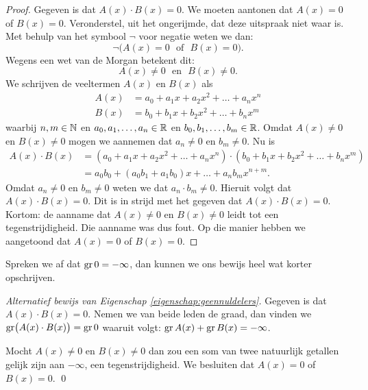 \documentclass{ximera}
\begin{document}
\begin{proof}

Gegeven is dat $A(x)\cdot B(x) = 0$. We moeten aantonen dat $A(x) = 0$ of $B(x) = 0$. Veronderstel, uit het ongerijmde, dat deze uitspraak niet waar is. Met behulp van het symbool $\neg$ voor 
negatie weten we dan:
\[
\neg\bigl(A(x) = 0 \,\, \text{ of } \,\, B(x) = 0\bigr).
\]
Wegens een wet van de Morgan betekent dit:
\[
A(x) \neq 0 \,\, \text{ en } \,\, B(x) \neq 0.
\] 
We schrijven de veeltermen $A(x)$ en $B(x)$ als
\begin{align*}
A(x) & = a_0 + a_1 x + a_2 x^2 + \dots + a_n x^n \\
B(x) & = b_0 + b_1 x + b_2 x^2 + \dots + b_n x^m
\end{align*}
waarbij $n,m \in \mathbb{N}$ en $a_0, a_1, \ldots, a_n \in \mathbb{R}$ en $b_0, b_1, \ldots, b_m \in \mathbb{R}$. Omdat $A(x) \neq 0$ en $B(x) \neq 0$ mogen we aannemen dat $a_n \neq 0$ en $b_m \neq 0$. Nu is
\begin{align*}
A(x) \cdot B(x) 
& = \left(a_0 + a_1 x + a_2 x^2 + \dots + a_n x^n\right) \cdot \left( b_0 + b_1 x + b_2 x^2 + \dots + b_n x^m\right) \\
& = a_0b_0 + (a_0b_1 + a_1b_0)x + \dots + a_n b_m x^{n+m}.
\end{align*}
Omdat $a_n \neq 0$ en $b_m \neq 0$ weten we dat $a_n \cdot b_m \neq 0$. Hieruit volgt dat $A(x) \cdot B(x) = 0$. Dit is in strijd met het gegeven dat $A(x)\cdot B(x) = 0$. Kortom: de aanname dat $A(x) \neq 0$ en $B(x) \neq 0$ leidt tot een tegenstrijdigheid. Die aanname was dus fout. Op die manier hebben we aangetoond dat $A(x) = 0$ of $B(x) = 0$. 

\end{proof}


\begin{Uitbreiding}
Spreken we af dat $\operatorname{gr} 0 = - \infty$, dan kunnen we ons bewijs heel wat korter opschrijven. 

{\em Alternatief bewijs van Eigenschap \ref{eigenschap:geennuldelers}.}
Gegeven is dat $A(x)\cdot B(x) = 0$. Nemen we van beide leden de graad, dan vinden we $\operatorname{gr}\bigl( A(x)\cdot B(x) \bigr) = \operatorname{gr} 0$ waaruit volgt: $\operatorname{gr} A(x) + \operatorname{gr} B(x) = - \infty$.

Mocht $A(x) \neq 0$ en $B(x) \neq 0$ dan zou een som van twee natuurlijk getallen gelijk zijn aan $-\infty$, een tegenstrijdigheid. We besluiten dat $A(x) = 0$ of $B(x) = 0$.
\qed
\end{Uitbreiding}



{}
\end{document}
